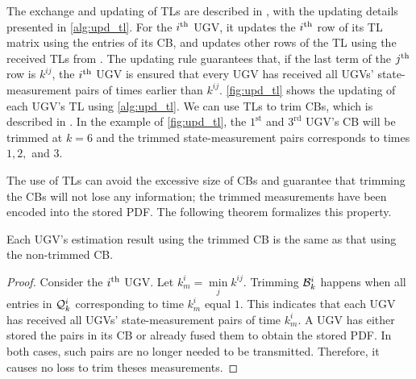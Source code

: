 	The exchange and updating of TLs are described in , with the updating details presented in \cref{alg:upd_tl}.
	For the $i^\text{th}$ UGV, it updates the $i^\text{th}$ row of its TL matrix using the entries of its CB, and updates other rows of the TL using the received TLs from {\inbhd}.
	The updating rule guarantees that, if the last term of the $j^\text{th}$ row is $k^{ij}$, \textcolor{\revcol}{the $i^\text{th}$ UGV is ensured that every UGV has received all UGVs' state-measurement pairs of times earlier than $k^{ij}$.
	\cref{fig:upd_tl} shows the updating of each UGV's TL using \cref{alg:upd_tl}.
	We can use TLs to trim CBs, which is described in .}
%	
	In the example of \cref{fig:upd_tl}, the $1^\text{st}$ and $3^\text{rd}$ UGV's CB will be trimmed at $k=6$ and the trimmed state-measurement pairs corresponds to times $1,2,$ and $3$.
	
	The use of TLs can avoid the excessive size of CBs and guarantee that trimming the CBs will not lose any information; the trimmed measurements have been encoded into the stored PDF.
	The following theorem formalizes this property.
	
	\begin{thm}\label{thm:trim_no_loss}
		Each UGV's estimation result using the trimmed CB is the same as that using the non-trimmed CB.
	\end{thm}
	
	\begin{proof}
		
		Consider the $i^\text{th}$ UGV. Let $k^i_m=\min\limits_j k^{ij}$. 
		Trimming $\mathcal{B}^i_k$ happens when all entries in $\mathcal{Q}^i_k$ corresponding to time $k^i_m$ equal $1$. 
		This indicates that each UGV has received all UGVs' state-measurement pairs of time $k^i_m$.
		A UGV has either stored the pairs in its CB or already fused them to obtain the stored PDF.
		In both cases, such pairs are no longer needed to be transmitted. %
		Therefore, it causes no loss to trim theses measurements.		
	\end{proof}
	
